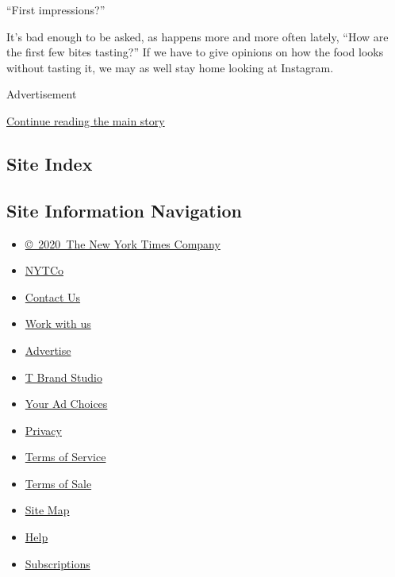 ``First impressions?''

It's bad enough to be asked, as happens more and more often lately,
``How are the first few bites tasting?'' If we have to give opinions on
how the food looks without tasting it, we may as well stay home looking
at Instagram.

Advertisement

\protect\hyperlink{after-bottom}{Continue reading the main story}

\hypertarget{site-index}{%
\subsection{Site Index}\label{site-index}}

\hypertarget{site-information-navigation}{%
\subsection{Site Information
Navigation}\label{site-information-navigation}}

\begin{itemize}
\tightlist
\item
  \href{https://help.nytimes3xbfgragh.onion/hc/en-us/articles/115014792127-Copyright-notice}{©~2020~The
  New York Times Company}
\end{itemize}

\begin{itemize}
\tightlist
\item
  \href{https://www.nytco.com/}{NYTCo}
\item
  \href{https://help.nytimes3xbfgragh.onion/hc/en-us/articles/115015385887-Contact-Us}{Contact
  Us}
\item
  \href{https://www.nytco.com/careers/}{Work with us}
\item
  \href{https://nytmediakit.com/}{Advertise}
\item
  \href{http://www.tbrandstudio.com/}{T Brand Studio}
\item
  \href{https://www.nytimes3xbfgragh.onion/privacy/cookie-policy\#how-do-i-manage-trackers}{Your
  Ad Choices}
\item
  \href{https://www.nytimes3xbfgragh.onion/privacy}{Privacy}
\item
  \href{https://help.nytimes3xbfgragh.onion/hc/en-us/articles/115014893428-Terms-of-service}{Terms
  of Service}
\item
  \href{https://help.nytimes3xbfgragh.onion/hc/en-us/articles/115014893968-Terms-of-sale}{Terms
  of Sale}
\item
  \href{https://spiderbites.nytimes3xbfgragh.onion}{Site Map}
\item
  \href{https://help.nytimes3xbfgragh.onion/hc/en-us}{Help}
\item
  \href{https://www.nytimes3xbfgragh.onion/subscription?campaignId=37WXW}{Subscriptions}
\end{itemize}
